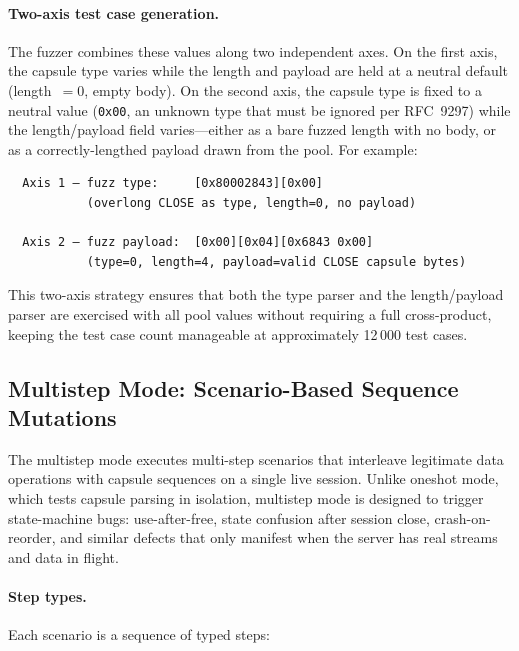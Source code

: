 \paragraph{Two-axis test case generation.} The fuzzer combines these values along two independent axes. On the first axis, the capsule type varies while the length and payload are held at a neutral default (length~$= 0$, empty body). On the second axis, the capsule type is fixed to a neutral value (\texttt{0x00}, an unknown type that must be ignored per RFC~9297) while the length/payload field varies---either as a bare fuzzed length with no body, or as a correctly-lengthed payload drawn from the pool. For example:

\begin{verbatim}
  Axis 1 — fuzz type:     [0x80002843][0x00]
           (overlong CLOSE as type, length=0, no payload)

  Axis 2 — fuzz payload:  [0x00][0x04][0x6843 0x00]
           (type=0, length=4, payload=valid CLOSE capsule bytes)
\end{verbatim}

\noindent This two-axis strategy ensures that both the type parser and the length/payload parser are exercised with all pool values without requiring a full cross-product, keeping the test case count manageable at approximately 12\,000 test cases.

\subsection{Multistep Mode: Scenario-Based Sequence Mutations}

The multistep mode executes multi-step scenarios that interleave legitimate data operations with capsule sequences on a single live session. Unlike oneshot mode, which tests capsule parsing in isolation, multistep mode is designed to trigger state-machine bugs: use-after-free, state confusion after session close, crash-on-reorder, and similar defects that only manifest when the server has real streams and data in flight.

\paragraph{Step types.} Each scenario is a sequence of typed steps:


